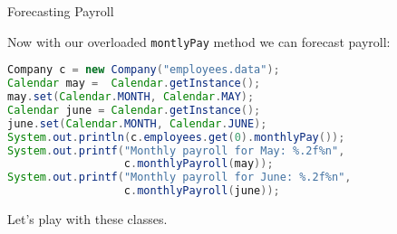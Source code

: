\documentclass{beamer}
\begin{document}
\begin{frame}[fragile]{Forecasting Payroll}


Now with our overloaded  {\tt montlyPay} method we can forecast payroll:
\begin{lstlisting}[language=Java]
Company c = new Company("employees.data");
Calendar may =  Calendar.getInstance();
may.set(Calendar.MONTH, Calendar.MAY);
Calendar june = Calendar.getInstance();
june.set(Calendar.MONTH, Calendar.JUNE);
System.out.println(c.employees.get(0).monthlyPay());
System.out.printf("Monthly payroll for May: %.2f%n",
                  c.monthlyPayroll(may));
System.out.printf("Monthly payroll for June: %.2f%n",
                  c.monthlyPayroll(june));
\end{lstlisting}

Let's play with these classes.


\end{frame}








\end{document}
